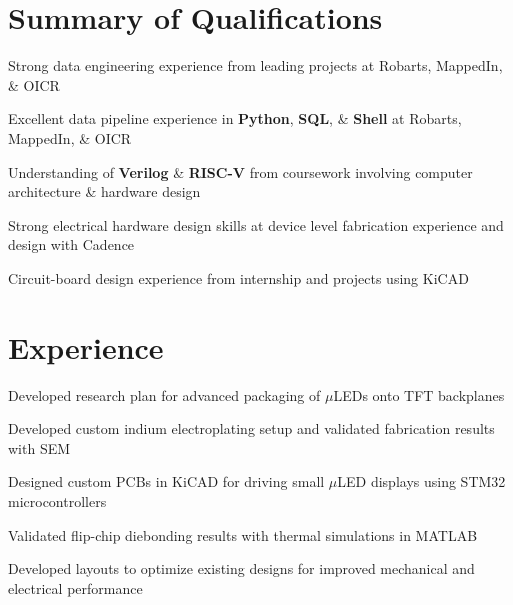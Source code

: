 \documentclass[]{chandan-cv}
\begin{document}
\hfill
\begin{minipage}[t]{0.75\textwidth}


\section{Summary of Qualifications}
\runsubsection{ }
\descript{ }
\location{ }
\vspace{\topsep} %
\begin{tightemize}
	\item Strong data engineering experience from leading projects at Robarts, MappedIn, \& OICR
	\item Excellent data pipeline experience in \textbf{Python}, \textbf{SQL}, \& \textbf{Shell} at Robarts, MappedIn, \& OICR 
	\item Understanding of \textbf{Verilog} \& \textbf{RISC-V} from coursework involving 
	computer architecture \& hardware design
	\item Strong electrical hardware design skills at device level fabrication experience and design with Cadence 
	\item Circuit-board design experience from internship and projects using KiCAD
\end{tightemize}
\sectionsep


\section{Experience}

\begin{tightemize}
        \item Developed research plan for advanced packaging of $\mu$LEDs onto TFT backplanes
		\item Developed custom indium electroplating setup and validated fabrication results with SEM
		\item Designed custom PCBs in KiCAD for driving small $\mu$LED displays using STM32 microcontrollers
		\item Validated flip-chip diebonding results with thermal simulations in MATLAB
		\item Developed layouts to optimize existing designs for improved mechanical and electrical performance
\end{tightemize}
\sectionsep


\end{minipage}
\end{document}

